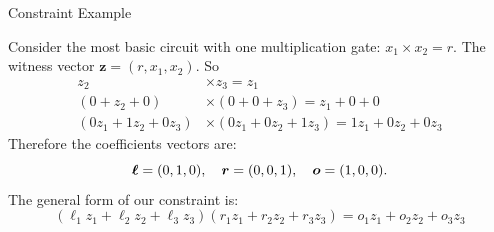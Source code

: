 \documentclass{zkdl-presentation-template}
\begin{document}
    \begin{frame}{Constraint Example}
        \begin{example}
            Consider the most basic circuit with one multiplication gate: $x_1 \times x_2 = r$.
            The witness vector $\mathbf{z} = (r, x_1, x_2)$. So
            \vspace{-5pt}
            \begin{align*}
                z_2 &\times z_3 = z_1 \\
                (0 + z_2 + 0) &\times (0 + 0 + z_3) = z_1 + 0 + 0 \\
                (0z_1 + 1z_2 + 0z_3) &\times (0z_1 + 0z_2 + 1z_3) = 1z_1 + 0z_2 + 0z_3
            \end{align*}
            Therefore the coefficients vectors are:
            \vspace{-5pt}
            \begin{equation*}
                \boldsymbol{\ell} = (0, 1, 0), \quad \boldsymbol{r} = (0, 0, 1), \quad \boldsymbol{o} = (1, 0, 0). 
                \vspace{-5pt}
            \end{equation*}
            The general form of our constraint is:
            \vspace{-5pt}
            \begin{equation*}
                (\ell_1z_1 + \ell_2z_2 + \ell_3z_3)(r_1z_1 + r_2z_2 + r_3z_3) = o_1z_1 + o_2z_2 + o_3z_3
            \end{equation*}
        \end{example}
    \end{frame}
\end{document}
